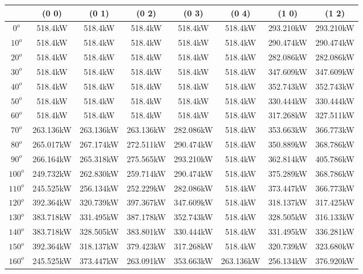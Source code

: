         \singlespacing
        \begin{table}[H]
        	\centering
        	\begin{tabular}{|c|c|c|c|c|c|c|c|} \hline
        			& (0 0)		& (0 1)		& (0 2)		& (0 3)		& (0 4)		& (1 0)		& (1 2)		\\ \hline
		$0^o$	& 518.4kW	& 518.4kW	& 518.4kW	& 518.4kW	& 518.4kW	& 293.210kW	& 293.210kW	\\ \hline
		$10^o$	& 518.4kW	& 518.4kW	& 518.4kW	& 518.4kW	& 518.4kW	& 290.474kW	& 290.474kW	\\ \hline
		$20^o$	& 518.4kW	& 518.4kW	& 518.4kW	& 518.4kW	& 518.4kW	& 282.086kW	& 282.086kW	\\ \hline
		$30^o$	& 518.4kW	& 518.4kW	& 518.4kW	& 518.4kW	& 518.4kW	& 347.609kW	& 347.609kW	\\ \hline
		$40^o$	& 518.4kW	& 518.4kW	& 518.4kW	& 518.4kW	& 518.4kW	& 352.743kW	& 352.743kW	\\ \hline
		$50^o$	& 518.4kW	& 518.4kW	& 518.4kW	& 518.4kW	& 518.4kW	& 330.444kW	& 330.444kW	\\ \hline
		$60^o$	& 518.4kW	& 518.4kW	& 518.4kW	& 518.4kW	& 518.4kW	& 317.268kW	& 327.511kW	\\ \hline
		$70^o$	& 263.136kW	& 263.136kW	& 263.136kW	& 282.086kW	& 518.4kW	& 353.663kW	& 366.773kW	\\ \hline
		$80^o$	& 265.017kW	& 267.174kW	& 272.511kW	& 290.474kW	& 518.4kW	& 350.889kW	& 368.786kW	\\ \hline
		$90^o$	& 266.164kW	& 265.318kW	& 275.565kW	& 293.210kW	& 518.4kW	& 362.814kW	& 405.786kW	\\ \hline
		$100^o$	& 249.732kW	& 262.830kW	& 259.714kW	& 290.474kW	& 518.4kW	& 375.289kW	& 368.786kW	\\ \hline
		$110^o$	& 245.525kW	& 256.134kW	& 252.229kW	& 282.086kW	& 518.4kW	& 373.447kW	& 366.773kW	\\ \hline
		$120^o$	& 392.364kW	& 320.739kW	& 397.367kW	& 347.609kW	& 518.4kW	& 318.137kW	& 317.425kW	\\ \hline
		$130^o$	& 383.718kW	& 331.495kW	& 387.178kW	& 352.743kW	& 518.4kW	& 328.505kW	& 316.133kW	\\ \hline
		$140^o$	& 383.718kW	& 328.505kW	& 383.801kW	& 330.444kW	& 518.4kW	& 331.495kW	& 336.281kW	\\ \hline
		$150^o$	& 392.364kW	& 318.137kW	& 379.423kW	& 317.268kW	& 518.4kW	& 320.739kW	& 323.680kW	\\ \hline
		$160^o$	& 245.525kW	& 373.447kW	& 263.091kW	& 353.663kW	& 263.136kW	& 256.134kW	& 376.920kW	\\ \hline

\end{tabular}
\end{table}
